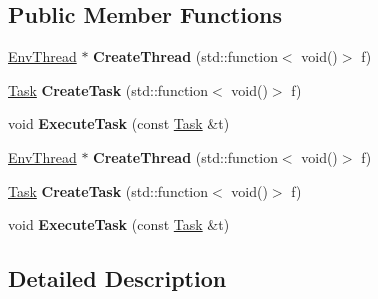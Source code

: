 \subsection*{Public Member Functions}
\begin{DoxyCompactItemize}
\item 
\mbox{\label{struct_eigen_1_1_stl_thread_environment_af68c7d15c5c24af34698df86c7f6285e}} 
\hyperlink{class_eigen_1_1_stl_thread_environment_1_1_env_thread}{Env\+Thread} $\ast$ {\bfseries Create\+Thread} (std\+::function$<$ void()$>$ f)
\item 
\mbox{\label{struct_eigen_1_1_stl_thread_environment_a10ff5893aa4cae1d8b2c6621b656e2cd}} 
\hyperlink{struct_eigen_1_1_stl_thread_environment_1_1_task}{Task} {\bfseries Create\+Task} (std\+::function$<$ void()$>$ f)
\item 
\mbox{\label{struct_eigen_1_1_stl_thread_environment_a97da912fd357ba916d7fa1301eaede79}} 
void {\bfseries Execute\+Task} (const \hyperlink{struct_eigen_1_1_stl_thread_environment_1_1_task}{Task} \&t)
\item 
\mbox{\label{struct_eigen_1_1_stl_thread_environment_af68c7d15c5c24af34698df86c7f6285e}} 
\hyperlink{class_eigen_1_1_stl_thread_environment_1_1_env_thread}{Env\+Thread} $\ast$ {\bfseries Create\+Thread} (std\+::function$<$ void()$>$ f)
\item 
\mbox{\label{struct_eigen_1_1_stl_thread_environment_a10ff5893aa4cae1d8b2c6621b656e2cd}} 
\hyperlink{struct_eigen_1_1_stl_thread_environment_1_1_task}{Task} {\bfseries Create\+Task} (std\+::function$<$ void()$>$ f)
\item 
\mbox{\label{struct_eigen_1_1_stl_thread_environment_a97da912fd357ba916d7fa1301eaede79}} 
void {\bfseries Execute\+Task} (const \hyperlink{struct_eigen_1_1_stl_thread_environment_1_1_task}{Task} \&t)
\end{DoxyCompactItemize}


\subsection{Detailed Description}


